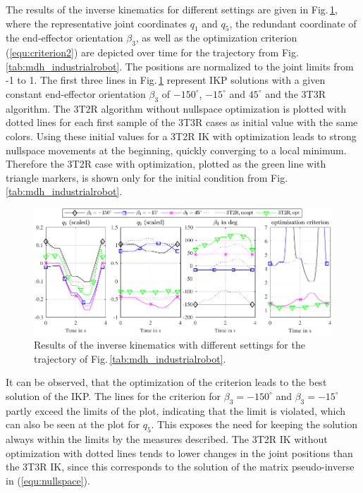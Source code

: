 \documentclass[robotics,article,submit,moreauthors,pdftex]{Definitions/mdpi}
\begin{document}
The results of the inverse kinematics for different settings are given in Fig.\,\ref{fig:serrob_traj_3T2R}, where the representative joint coordinates $q_1$ and $q_5$, the redundant coordinate of the end-effector orientation $\beta_3$, as well as the optimization criterion (\ref{equ:criterion2}) are depicted over time for the trajectory from Fig.\,\ref{tab:mdh_industrialrobot}.
The positions are normalized to the joint limits from -1 to 1.
The first three lines in Fig.\,\ref{fig:serrob_traj_3T2R} represent IKP solutions with a given constant end-effector orientation $\beta_3$ of $-150^\circ$, $-15^\circ$ and $45^\circ$ and the 3T3R algorithm.
The 3T2R algorithm without nullspace optimization is plotted with dotted lines for each first sample of the 3T3R cases as initial value with the same colors.
Using these initial values for a 3T2R IK with optimization leads to strong nullspace movements at the beginning, quickly converging to a local minimum.
Therefore the 3T2R case with optimization, plotted as the green line with triangle markers, is shown only for the initial condition from Fig.\,\ref{tab:mdh_industrialrobot}.
%
\begin{figure}[b]
	\includegraphics{serrob_traj_nullspace_optim.pdf}
	\caption{Results of the inverse kinematics with different settings for the trajectory of Fig.\,\ref{tab:mdh_industrialrobot}.}
	\label{fig:serrob_traj_3T2R}
\end{figure}
%
It can be observed, that the optimization of the criterion leads to the best solution of the IKP.
The lines for the criterion for $\beta_3=-150^\circ$ and $\beta_3=-15^\circ$ partly exceed the limits of the plot, indicating that the limit is violated, which can also be seen at the plot for $q_5$.
This exposes the need for keeping the solution always within the limits by the measures described.
The 3T2R IK without optimization with dotted lines tends to lower changes in the joint positions than the 3T3R IK, since this corresponds to the solution of the matrix pseudo-inverse in (\ref{equ:nullspace}).
\end{document}
